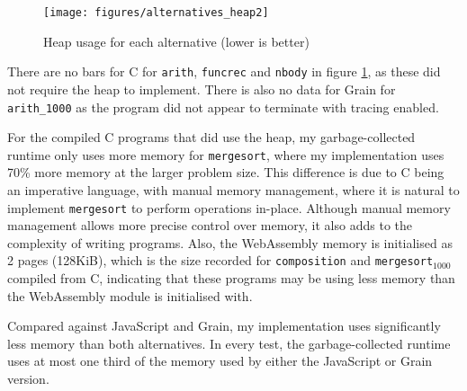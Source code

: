 \begin{figure}[H]
\hspace{-1cm}
\texttt{[image: figures/alternatives\_heap2]}
\vspace{-0.5cm}
\caption{Heap usage for each alternative (lower is better)}
 \label{fig:alt_heap} 
\end{figure}

There are no bars for C for \verb|arith|, \verb|funcrec| and \verb|nbody| in figure \ref{fig:alt_heap}, as these did not require the heap to implement. 
There is also no data for Grain for \verb|arith_1000| as the program did not appear to terminate with tracing enabled.

For the compiled C programs that did use the heap, my garbage-collected runtime only uses more memory for \verb|mergesort|, where my implementation uses 70\% more memory at the larger problem size. This difference is due to C being an imperative language, with manual memory management, where it is natural to implement \verb|mergesort| to perform operations in-place. Although manual memory management allows more precise control over memory, it also adds to the complexity of writing programs.
Also, the WebAssembly memory is initialised as 2 pages (128KiB), which is the size recorded for \verb|composition| and \verb|mergesort|$_{1000}$ compiled from C, indicating that these programs may be using less memory than the WebAssembly module is initialised with. %

Compared against JavaScript and Grain, my implementation uses significantly less memory than both alternatives. In every test, the garbage-collected runtime uses at most one third of the memory used by either the JavaScript or Grain version. 




